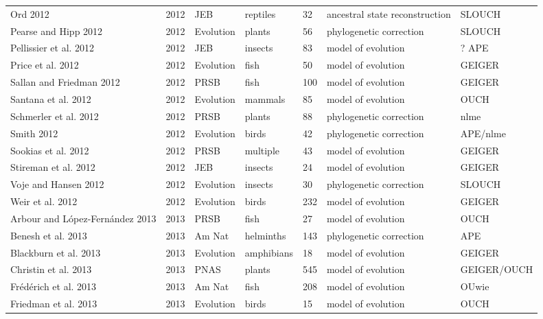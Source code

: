 \begin{landscape}
\begin{center}
\begin{longtable}{p{6cm}llllll}
Ord 2012  &   2012    &   JEB &   reptiles    &   32  &   ancestral state reconstruction  &   SLOUCH  \\
Pearse and Hipp 2012  &   2012    &   Evolution   &   plants  &   56  &   phylogenetic correction &   SLOUCH  \\
Pellissier et al. 2012    &   2012    &   JEB &   insects &   83  &   model of evolution  &   ? APE \\
Price et al. 2012 &   2012    &   Evolution   &   fish    &   50  &   model of evolution  &   GEIGER  \\
Sallan and Friedman 2012  &   2012    &   PRSB    &   fish    &   100 &   model of evolution  &   GEIGER  \\
Santana et al. 2012   &   2012    &   Evolution   &   mammals &   85  &   model of evolution  &   OUCH    \\
Schmerler et al. 2012 &   2012    &   PRSB    &   plants  &   88  &   phylogenetic correction &   nlme    \\
Smith 2012    &   2012    &   Evolution   &   birds   &   42  &   phylogenetic correction &   APE/nlme    \\
Sookias et al. 2012   &   2012    &   PRSB    &   multiple    &   43  &   model of evolution  &   GEIGER  \\
Stireman et al. 2012  &   2012    &   JEB &   insects &   24  &   model of evolution  &   GEIGER  \\
Voje and Hansen 2012  &   2012    &   Evolution   &   insects &   30  &   phylogenetic correction &   SLOUCH  \\
Weir et al. 2012  &   2012    &   Evolution   &   birds   &   232 &   model of evolution  &   GEIGER  \\
Arbour and L\'{o}pez-Fern\'{a}ndez 2013   &   2013    &   PRSB    &   fish    &   27  &   model of evolution  &   OUCH    \\
Benesh et al. 2013    &   2013    &   Am Nat  &   helminths   &   143 &   phylogenetic correction &   APE \\
Blackburn et al. 2013 &   2013    &   Evolution   &   amphibians  &   18  &   model of evolution  &   GEIGER  \\
Christin et al. 2013  &   2013    &   PNAS    &   plants  &   545 &   model of evolution  &   GEIGER/OUCH \\
Fr\'{e}d\'{e}rich et al. 2013 &   2013    &   Am Nat  &   fish    &   208 &   model of evolution  &   OUwie   \\
Friedman et al. 2013  &   2013    &   Evolution   &   birds   &   15  &   model of evolution  &   OUCH    \\

\end{longtable}
\end{center}
\end{landscape}
